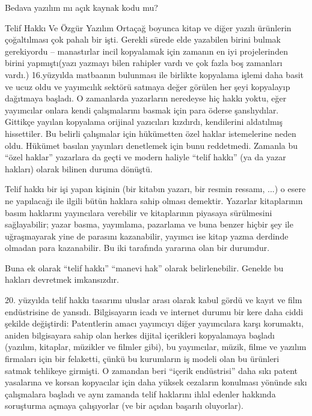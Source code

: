\begin{section}{Bedava yazılım mı açık kaynak kodu mu?}
\begin{subsection}{Telif Hakkı Ve Özgür Yazılım}
Ortaçağ boyunca kitap ve diğer yazılı ürünlerin çoğaltılması çok pahalı bir işti. Gerekli sürede elde yazabilen birini bulmak gerekiyordu -- manastırlar incil kopyalamak için zamanın en iyi projelerinden birini yapmıştı(yazı yazmayı bilen rahipler vardı ve çok fazla boş zamanları vardı.) 16.yüzyılda matbaanın bulunması ile birlikte kopyalama işlemi daha basit ve ucuz oldu ve yayımcılık sektörü satmaya değer görülen her şeyi kopyalayıp dağıtmaya başladı. O zamanlarda yazarların neredeyse hiç hakkı yoktu, eğer yayımcılar onlara kendi çalışmalarını basmak için para öderse şanslıydılar. Gittikçe yayılan kopyalama orijinal yazıcıları kızdırdı, kendilerini aldatılmış hissettiler. Bu belirli çalışmalar için hükümetten özel haklar istemelerine neden oldu. Hükümet basılan yayınları denetlemek için bunu reddetmedi. Zamanla bu “özel haklar” yazarlara da geçti ve modern haliyle “telif hakkı” (ya da yazar hakları) olarak bilinen duruma dönüştü.

Telif hakkı bir işi yapan kişinin (bir kitabın yazarı, bir resmin ressamı, ...) o esere ne yapılacağı ile ilgili bütün haklara sahip olması demektir. Yazarlar kitaplarının basım haklarını yayıncılara verebilir ve kitaplarının piyasaya sürülmesini sağlayabilir; yazar basma, yayımlama, pazarlama ve buna benzer hiçbir şey ile uğraşmayarak yine de parasını kazanabilir, yayımcı ise kitap yazma derdinde olmadan para kazanabilir. Bu iki tarafında yararına olan bir durumdur.

Buna ek olarak “telif hakkı” “manevi hak” olarak belirlenebilir. Genelde bu hakları devretmek imkansızdır.

20. yüzyılda telif hakkı tasarımı uluslar arası olarak kabul gördü ve kayıt ve film endüstrisine de yansıdı. Bilgisayarın icadı ve internet durumu bir kere daha ciddi şekilde değiştirdi: Patentlerin amacı yayımcıyı diğer yayımcılara karşı korumaktı, aniden bilgisayara sahip olan herkes dijital içerikleri kopyalamaya başladı (yazılım, kitaplar, müzikler ve filmler gibi), bu yayımcılar, müzik, filme ve yazılım firmaları için bir felaketti, çünkü bu kurumların iş modeli olan bu ürünleri satmak tehlikeye girmişti. O zamandan beri “içerik endüstrisi” daha sıkı patent yasalarına ve korsan kopyacılar için daha yüksek cezaların konulması yönünde sıkı çalışmalara başladı ve aynı zamanda telif haklarını ihlal edenler hakkında soruşturma açmaya çalışıyorlar (ve bir açıdan başarılı oluyorlar).


\end{subsection}
\end{section}
